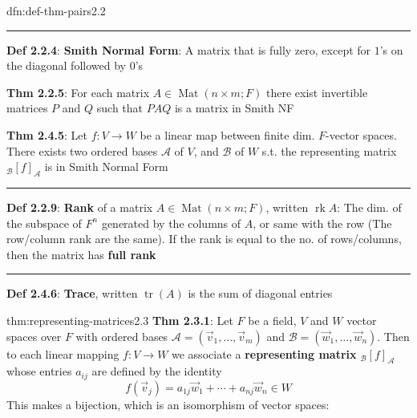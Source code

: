 \documentclass[landscape, 8pt]{extarticle}
\DeclareMathOperator{\Mat}{Mat}
\DeclareMathOperator{\rk}{rk}
\DeclareMathOperator{\Tr}{tr}
\begin{document}
\begin{multicols}{3}
\begin{dfn}{dfn:def-thm-pairs}{2.2}
    \vspace{-5pt}
    \noindent\rule{\textwidth}{0.6pt}
    \textbf{Def 2.2.4}: \textbf{Smith Normal Form}: A matrix that is fully zero, except for $1$'s on the diagonal followed by $0$'s

    \textbf{Thm 2.2.5}: For each matrix $A\in \Mat(n \times m; F)$ there exist invertible matrices $P$ and $Q$ such that $PAQ$ is a matrix in Smith NF
    
    \textbf{Thm 2.4.5}: Let $f : V \to W$ be a linear map between finite dim. $F$-vector spaces. There exists two ordered bases $\mathcal{A}$ of $V$, and $\mathcal{B}$ of $W$ s.t. the representing matrix ${}_{\mathcal{B}}[f]_{\mathcal{A}}$ is in Smith Normal Form

    \vspace{-5pt}
    \noindent\rule{\textwidth}{0.6pt}

    \textbf{Def 2.2.9}: \textbf{Rank} of a matrix $A\in \Mat(n \times m; F)$, written $\rk A$: The dim. of the subspace of $F^{n}$ generated by the columns of $A$, or same with the row (The row/column rank are the same). If the rank is equal to the no. of rows/columns, then the matrix has \textbf{full rank}

    \vspace{-5pt}
    \noindent\rule{\textwidth}{0.6pt}
    \textbf{Def 2.4.6}: \textbf{Trace}, written $\Tr(A)$ is the sum of diagonal entries
\end{dfn}

\vspace{-5pt}

\begin{thm}{thm:representing-matrices}{2.3}
    \textbf{Thm 2.3.1}: Let $F$ be a field, $V$ and $W$ vector spaces over $F$ with ordered bases $\mathcal{A} = (\vec{v}_{1},\dots,\vec{v}_{m})$ and $\mathcal{B} = (\vec{w}_{1},\dots,\vec{w}_{n})$. Then to each linear mapping $f : V \to W$ we associate a \textbf{representing matrix} ${}_{\mathcal{B}}[f]_{\mathcal{A}}$ whose entries $a_{ij}$ are defined by the identity
    \[f(\vec{v}_{j}) = a_{1j}\vec{w}_{1} + \cdots + a_{nj}\vec{w}_{n}\in W\]
    This makes a bijection, which is an isomorphism of vector spaces:


\end{thm}
\end{multicols}
\end{document}
